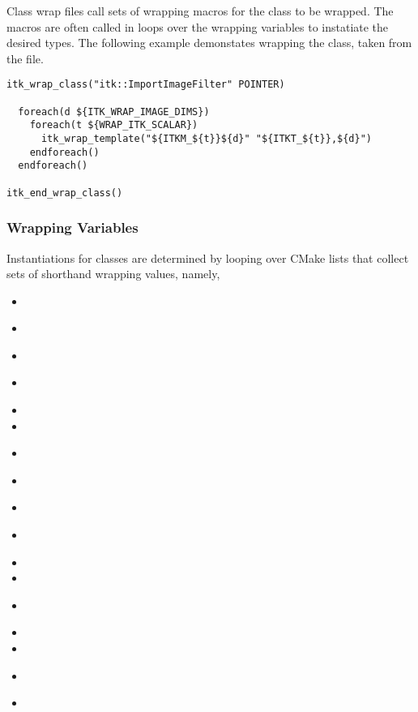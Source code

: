 Class wrap files call sets of wrapping macros for the class to be wrapped. The
macros are often called in loops over the wrapping variables to instatiate the
desired types. The following example demonstates wrapping the
 class, taken from the
 file.

\begin{verbatim}
itk_wrap_class("itk::ImportImageFilter" POINTER)

  foreach(d ${ITK_WRAP_IMAGE_DIMS})
    foreach(t ${WRAP_ITK_SCALAR})
      itk_wrap_template("${ITKM_${t}}${d}" "${ITKT_${t}},${d}")
    endforeach()
  endforeach()

itk_end_wrap_class()
\end{verbatim}


\subsubsection{Wrapping Variables}

Instantiations for classes are determined by looping over CMake lists that
collect sets of shorthand wrapping values, namely,

\begin{itemize}
  \item {}
  \item {}
    \\
  \item {}
  \item {}
    \\
  \item {}
  \item {}
  \item {}
    \\
  \item {}
  \item {}
    \\
  \item {}
    \\
  \item {}
  \item {}
  \item {}
    \\
  \item {}
  \item {}
  \item {}
    \\
  \item {}
\end{itemize}

